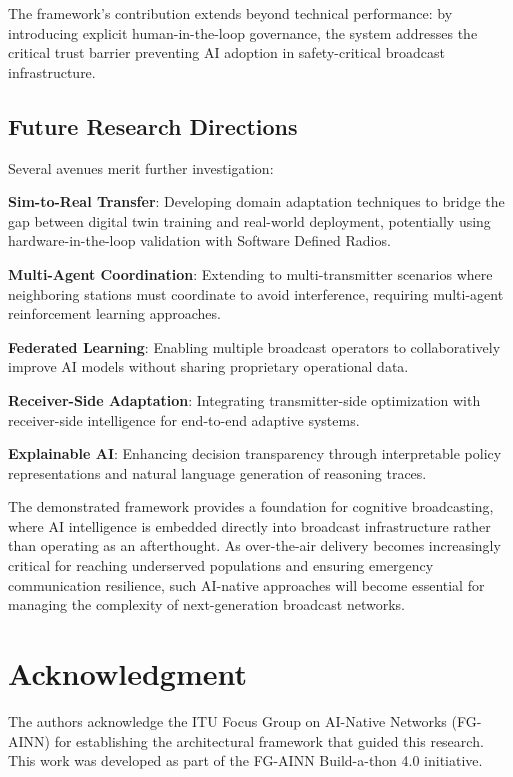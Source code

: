 \documentclass[conference]{IEEEtran}
\begin{document}
The framework's contribution extends beyond technical performance: by introducing explicit human-in-the-loop governance, the system addresses the critical trust barrier preventing AI adoption in safety-critical broadcast infrastructure.

\subsection{Future Research Directions}

Several avenues merit further investigation:

\textbf{Sim-to-Real Transfer}: Developing domain adaptation techniques to bridge the gap between digital twin training and real-world deployment, potentially using hardware-in-the-loop validation with Software Defined Radios.

\textbf{Multi-Agent Coordination}: Extending to multi-transmitter scenarios where neighboring stations must coordinate to avoid interference, requiring multi-agent reinforcement learning approaches.

\textbf{Federated Learning}: Enabling multiple broadcast operators to collaboratively improve AI models without sharing proprietary operational data.

\textbf{Receiver-Side Adaptation}: Integrating transmitter-side optimization with receiver-side intelligence for end-to-end adaptive systems.

\textbf{Explainable AI}: Enhancing decision transparency through interpretable policy representations and natural language generation of reasoning traces.

The demonstrated framework provides a foundation for cognitive broadcasting, where AI intelligence is embedded directly into broadcast infrastructure rather than operating as an afterthought. As over-the-air delivery becomes increasingly critical for reaching underserved populations and ensuring emergency communication resilience, such AI-native approaches will become essential for managing the complexity of next-generation broadcast networks.

\section*{Acknowledgment}
The authors acknowledge the ITU Focus Group on AI-Native Networks (FG-AINN) for establishing the architectural framework that guided this research. This work was developed as part of the FG-AINN Build-a-thon 4.0 initiative.
\end{document}
